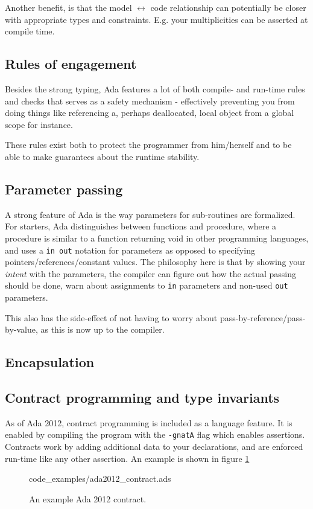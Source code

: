 \documentclass[10pt,a4paper]{article}
\def\Code#1{\texttt{#1}}
\begin{document}
Another benefit, is that the model $\leftrightarrow$ code relationship can potentially be closer with appropriate types and constraints. E.g. your multiplicities can be asserted at compile time.

\subsection{Rules of engagement}
Besides the strong typing, Ada features a lot of both compile- and run-time rules and checks that serves as a safety mechanism - effectively preventing you from doing things like referencing a, perhaps deallocated, local object from a global scope for instance.

These rules exist both to protect the programmer from him/herself and to be able to make guarantees about the runtime stability.

\subsection{Parameter passing}
A strong feature of Ada is the way parameters for sub-routines are formalized. For starters, Ada distinguishes between functions and procedure, where a procedure is similar to a function returning void in other programming languages, and uses a \Code{in out} notation for parameters as opposed to specifying pointers/references/constant values. The philosophy here is that by showing your \emph{intent} with the parameters, the compiler can figure out how the actual passing should be done, warn about assignments to \Code{in} parameters and non-used \Code{out} parameters.

This also has the side-effect of not having to worry about pass-by-reference/pass-by-value, as this is now up to the compiler.

\subsection{Encapsulation}


\subsection{Contract programming and type invariants}
As of Ada 2012, contract programming is included as a language feature. It is enabled by compiling the program with the \Code{-gnatA} flag which enables assertions.
Contracts work by adding additional data to your declarations, and are enforced run-time like any other assertion. An example is shown in figure \ref{fig:ada2012_contract}
\begin{figure}[h]
\centering
 {code_examples/ada2012_contract.ads}
 \caption{An example Ada 2012 contract.}
 \label{fig:ada2012_contract}
\end{figure}
\end{document}
